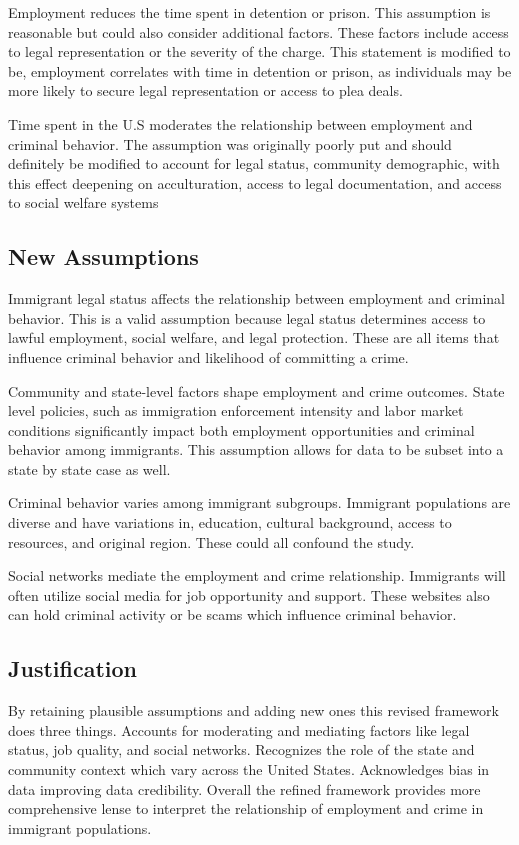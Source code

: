 \documentclass[12pt,letterpaper]{article}
\begin{document}
            \indent Employment reduces the time spent in detention or prison. This assumption is reasonable but could also consider additional factors. These factors include access to legal representation or the severity of the charge. This statement is modified to be, employment correlates with time in detention or prison, as individuals may be more likely to secure legal representation or access to plea deals.
            
            \indent Time spent in the U.S moderates the relationship between employment and criminal behavior. The assumption was originally poorly put and should definitely be modified to account for legal status, community demographic, with this effect deepening on acculturation, access to legal documentation, and access to social welfare systems
            
    \subsection{New Assumptions}
            \indent Immigrant legal status affects the relationship between employment and criminal behavior. This is a valid assumption because legal status determines access to lawful employment, social welfare, and legal protection. These are all items that influence criminal behavior and likelihood of committing a crime.
            
            \indent Community and state-level factors shape employment and crime outcomes. State level policies, such as immigration enforcement intensity and labor market conditions significantly impact both employment opportunities and criminal behavior among immigrants. This assumption allows for data to be subset into a state by state case as well.

            \indent Criminal behavior varies among immigrant subgroups. Immigrant populations are diverse and have variations in, education, cultural background, access to resources, and original region. These could all confound the study.

            \indent Social networks mediate the employment and crime relationship. Immigrants will often utilize social media for job opportunity and support. These websites also can hold criminal activity or be scams which influence criminal behavior.
    \subsection{Justification}
            \indent By retaining plausible assumptions and adding new ones this revised framework does three things. Accounts for moderating and mediating factors like legal status, job quality, and social networks. Recognizes the role of the state and community context which vary across the United States. Acknowledges bias in data improving data credibility. Overall the refined framework provides more comprehensive lense to interpret the relationship of employment and crime in immigrant populations. 
\end{document}
